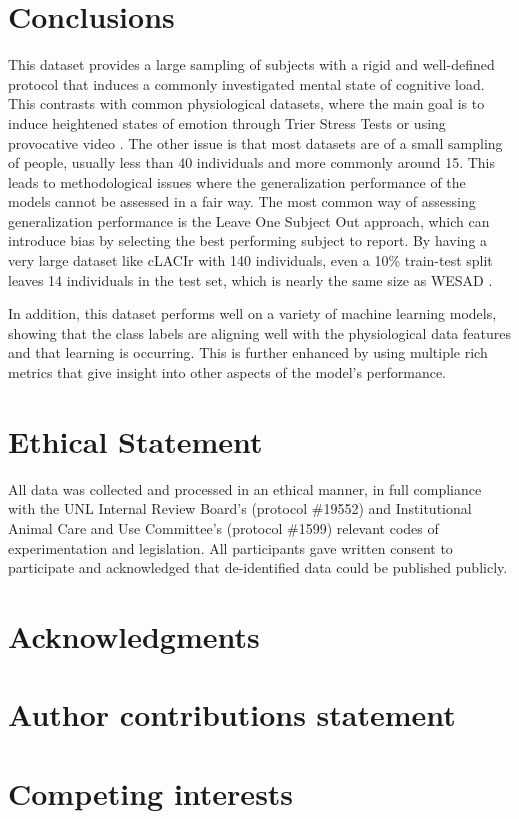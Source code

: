 \documentclass[12pt]{iopart}
\begin{document}
\section*{Conclusions}

This dataset provides a large sampling of subjects with a rigid and well-defined protocol that induces a commonly investigated mental state of cognitive load.  This contrasts with common physiological datasets, where the main goal is to induce heightened states of emotion through Trier Stress Tests \cite{schmidt2018introducing} or using provocative video \cite{sharma2019dataset}.  The other issue is that most datasets are of a small sampling of people, usually less than 40 individuals and more commonly around 15.  This leads to methodological issues where the generalization performance of the models cannot be assessed in a fair way.  The most common way of assessing generalization performance is the Leave One Subject Out approach, which can introduce bias by selecting the best performing subject to report.  By having a very large dataset like cLACIr with 140 individuals, even a 10\% train-test split leaves 14 individuals in the test set, which is nearly the same size as WESAD \cite{schmidt2018introducing}.  

In addition, this dataset performs well on a variety of machine learning models, showing that the class labels are aligning well with the physiological data features and that learning is occurring.  This is further enhanced by using multiple rich metrics that give insight into other aspects of the model's performance.

\section*{Ethical Statement}

All data was collected and processed in an ethical manner, in full compliance with the UNL Internal Review Board's (protocol \#19552) and Institutional Animal Care and Use Committee's (protocol \#1599) relevant codes of experimentation and legislation.  All participants gave written consent to participate and acknowledged that de-identified data could be published publicly. 

\section*{Acknowledgments} 

\section*{Author contributions statement}

\section*{Competing interests} 

\printbibliography %
\end{document}
